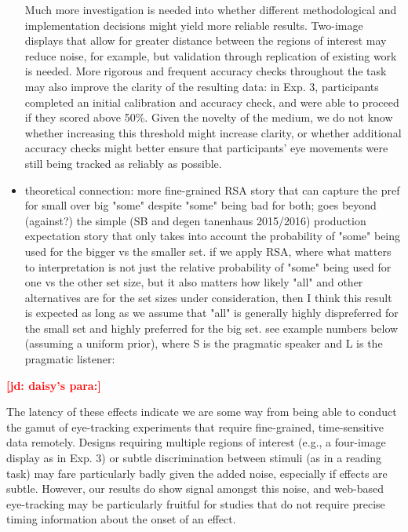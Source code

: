 \documentclass[10pt,letterpaper]{article}
\newcommand{\jd}[1]{\textcolor{Red}{\textbf{[jd: #1]}}}
\begin{document}
\begin{itemize}
Much more investigation is needed into whether different methodological and implementation decisions might yield more reliable results. Two-image displays that allow for greater distance between the regions of interest may reduce noise, for example, but validation through replication of existing work is needed. More rigorous and frequent accuracy checks throughout the task may also improve the clarity of the resulting data: in Exp. 3, participants completed an initial calibration and accuracy check, and were able to proceed if they scored above 50\%. Given the novelty of the medium, we do not know whether increasing this threshold might increase clarity, or whether additional accuracy checks might better ensure that participants' eye movements were still being tracked as reliably as possible. 

	\item theoretical connection: more fine-grained RSA story that can capture the pref for small over big "some" despite "some" being bad for both; goes beyond (against?) the simple (SB and degen tanenhaus 2015/2016) production expectation story that only takes into account the probability of "some" being used for the bigger vs the smaller set. if we apply RSA, where what matters to interpretation is not just the relative probability of "some" being used for one vs the other set size, but it also matters how likely "all" and other alternatives are for the set sizes under consideration, then I think this result is expected as long as we assume that "all" is generally highly dispreferred for the small set and highly preferred for the big set. see example numbers below (assuming a uniform prior), where S is the pragmatic speaker and L is the pragmatic listener:
\end{itemize}

\jd{daisy's para:}

The latency of these effects indicate we are some way from being able to conduct the gamut of eye-tracking experiments that require fine-grained, time-sensitive data remotely. Designs requiring multiple regions of interest (e.g., a four-image display as in Exp. 3) or subtle discrimination between stimuli (as in a reading task) may fare particularly badly given the added noise, especially if effects are subtle. However, our results do show signal amongst this noise, and web-based eye-tracking may be particularly fruitful for studies that do not require precise timing information about the onset of an effect. 
\end{document}
